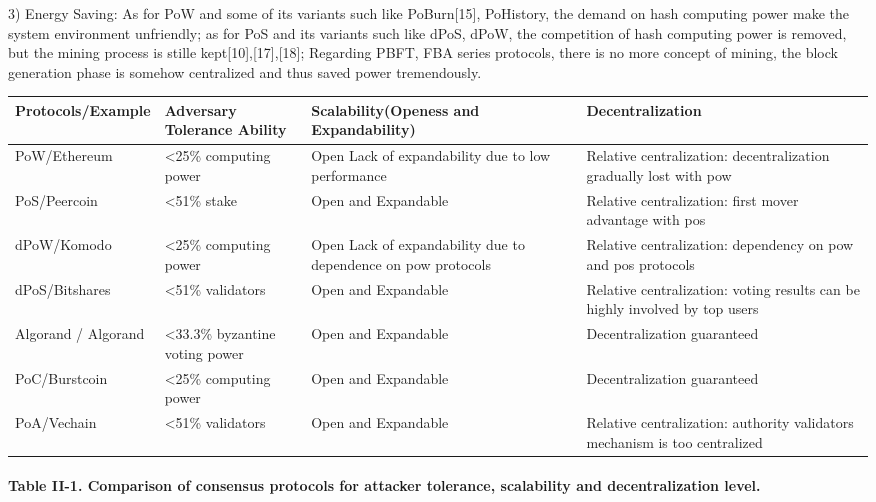 \documentclass[doublespacing]{bmcart}
\begin{document}
\begin{CJK*}{UTF8}{gbsn}
3)  Energy Saving: As for PoW and some of its variants such like PoBurn[15], PoHistory, the demand on hash computing power make the system environment unfriendly; as for PoS and its variants such like dPoS, dPoW, the competition of hash computing power is removed, but the mining process is stille kept[10],[17],[18];
Regarding PBFT, FBA series protocols, there is no more concept of mining, the block generation phase is somehow centralized and thus saved power tremendously.

\begin{tabular}{p{2cm}p{3cm}p{3cm}p{3cm}}
\hline
Protocols/E\-xample  & 
Adversary Tolerance Ability & 
Scalability(Openess and Expandability) & Decentralization \\ \hline

PoW/Ethe\-reum  & \textless25\% computing power & Open \newline Lack of expandability due to low performance & Relative centralization:  decentralization gradually lost with pow\\ \hline

PoS/Peercoin & 
\textless51\% stake & 
Open and Expandable & 
Relative centralization: first mover advantage with pos\\ \hline

dPoW/Komo\-do  & 
\textless25\% computing power &
  Open  \newline Lack of expandability due to dependence on pow protocols & 
  Relative centralization: dependency on pow and pos protocols \\ \hline
dPoS/\newline Bitshares  & \textless51\% validators & Open and Expandable & Relative centralization: voting results can be highly involved by top users \\ \hline
Algorand / Algorand & \textless33.3\% byzantine voting power & Open and Expandable & Decentralization guaranteed  \\ \hline
PoC/Burst\-coin &
 \textless25\% computing power &
  Open and Expandable &
  Decentralization guaranteed \\ \hline
  
  PoA/Vechain &
 \textless51\% validators &
  Open and Expandable &
  Relative centralization: authority validators mechanism is too centralized\\ \hline
  \end{tabular}
\paragraph{Table II-1. Comparison of consensus protocols for attacker tolerance, scalability and decentralization level.}
	 

\end{CJK*}
\end{document}
